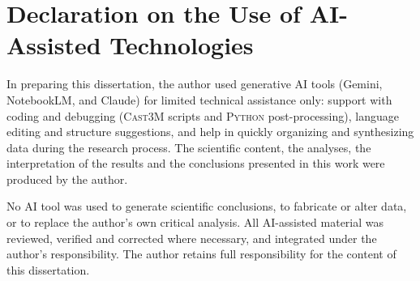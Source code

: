 \clearpage
\chapter*{Declaration on the Use of AI-Assisted Technologies}

In preparing this dissertation, the author used generative AI tools (Gemini, NotebookLM, and Claude) for limited technical assistance only: support with coding and debugging (\textsc{Cast3M} scripts and \textsc{Python} post-processing), language editing and structure suggestions, and help in quickly organizing and synthesizing data during the research process. The scientific content, the analyses, the interpretation of the results and the conclusions presented in this work were produced by the author.

No AI tool was used to generate scientific conclusions, to fabricate or alter data, or to replace the author's own critical analysis. All AI-assisted material was reviewed, verified and corrected where necessary, and integrated under the author's responsibility. The author retains full responsibility for the content of this dissertation.
